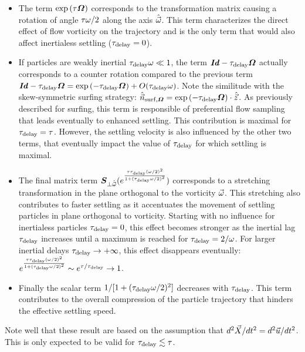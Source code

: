 \begin{itemize}
	\item The term $\exp \left( \tau \boldsymbol{\varOmega} \right)$ corresponds to the transformation matrix causing a rotation of angle $\tau \omega / 2$ along the axis $\hat{\vec{\omega}}$. This term characterizes the direct effect of flow vorticity on the trajectory and is the only term that would also affect inertialess settling ($\tau_{\mathrm{delay}} = 0$).
	\item If particles are weakly inertial $\tau_{\mathrm{delay}} \omega \ll 1$, the term $\boldsymbol{\mathit{Id}} - \tau_{\mathrm{delay}} \boldsymbol{\varOmega}$ actually corresponds to a counter rotation compared to the previous term $\boldsymbol{\mathit{Id}} - \tau_{\mathrm{delay}} \boldsymbol{\varOmega} = \exp \left( - \tau_{\mathrm{delay}} \boldsymbol{\varOmega} \right) + O(\tau_{\mathrm{delay}} \omega)$. 
		Note the similitude with the skew-symmetric surfing strategy: $\hat{\vec{n}}_{\mathrm{surf}, \boldsymbol{\varOmega}} = \exp \left( - \tau_{\mathrm{delay}} \boldsymbol{\varOmega} \right) \cdot \hat{\vec{z}}$. 
		As previously described for surfing, this term is responsible of preferential flow sampling that leads eventually to enhanced settling.
		This contribution is maximal for $\tau_{\mathrm{delay}} = \tau$. 
		However, the settling velocity is also influenced by the other two terms, that eventually impact the value of $\tau_{\mathrm{delay}}$ for which settling is maximal.
	\item The final matrix term $\boldsymbol{S}_{\perp \hat{\vec{\omega}}} ( e^{\frac{\tau \tau_{\mathrm{delay}} (\omega/2)^2}{1 + (\tau_{\mathrm{delay}} \omega/2)^2}} )$ corresponds to a stretching transformation in the plane orthogonal to the vorticity $\vec{\omega}$. 
		This stretching also contributes to faster settling as it accentuates the movement of settling particles in plane orthogonal to vorticity. 
		Starting with no influence for inertialess particles $\tau_{\mathrm{delay}} = 0$, this effect becomes stronger as the inertial lag $\tau_{\mathrm{delay}}$ increases until a maximum is reached for $\tau_{\mathrm{delay}} = 2 / \omega$. 
		For larger inertial delays $\tau_{\mathrm{delay}} \to +\infty$, this effect disappears eventually: $e^{\frac{\tau \tau_{\mathrm{delay}} (\omega/2)^2}{1 + (\tau_{\mathrm{delay}} \omega/2)^2}} \sim e^{\tau / \tau_{\mathrm{delay}}} \to 1$.
	\item Finally the scalar term $1/[1 + (\tau_{\mathrm{delay}} \omega / 2)^2]$ decreases with $\tau_{\mathrm{delay}}$. 
		This term contributes to the overall compression of the particle trajectory that hinders the effective settling speed.
\end{itemize}
Note well that these result are based on the assumption that $d^2 \vec{X} / dt^2 = d^2 \vec{u} / dt^2$.
This is only expected to be valid for $\tau_{\mathrm{delay}} \lesssim \tau$.

